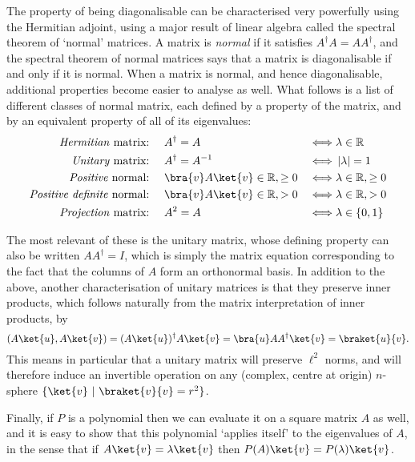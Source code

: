 The property of being diagonalisable can be characterised very powerfully using the Hermitian adjoint, using a major result of linear algebra called the spectral theorem of `normal' matrices. A matrix is \emph{normal} if it satisfies $A^\dagger A = AA^\dagger$, and the spectral theorem of normal matrices says that a matrix is diagonalisable if and only if it is normal. When a matrix is normal, and hence diagonalisable, additional properties become easier to analyse as well. What follows is a list of different classes of normal matrix, each defined by a property of the matrix, and by an equivalent property of all of its eigenvalues:
\begin{align*}
	\text{\emph{Hermitian} matrix:\ }&&& A^\dagger = A & \iff& \lambda \in \mathbb{R} \\
	\text{\emph{Unitary} matrix:\ }&&& A^\dagger = A^{-1} & \iff& \ord{\lambda}=1 \\
	\text{\emph{Positive} normal:\ }&&& \bra{v}A\ket{v} \in \mathbb{R}, \geq 0 & \iff& \lambda \in \mathbb{R}, \geq 0 \\
	\text{\emph{Positive definite} normal:\ }&&& \bra{v}A\ket{v} \in \mathbb{R}, > 0 & \iff& \lambda \in \mathbb{R}, > 0 \\
	\text{\emph{Projection} matrix:\ }&&& A^2 = A & \iff& \lambda \in \{0, 1\} \\
\end{align*}

The most relevant of these is the unitary matrix, whose defining property can also be written $AA^\dagger = I$, which is simply the matrix equation corresponding to the fact that the columns of $A$ form an orthonormal basis. In addition to the above, another characterisation of unitary matrices is that they preserve inner products, which follows naturally from the matrix interpretation of inner products, by
\[(A\ket{u}, A\ket{v}) = (A\ket{u})^\dagger A\ket{v} = \bra{u}AA^\dagger \ket{v} = \braket{u}{v}.\]
This means in particular that a unitary matrix will preserve $\ell^2$ norms, and will therefore induce an invertible operation on any (complex, centre at origin) $n$-sphere $\{\ket{v}\ |\ \braket{v}{v} = r^2\}$.

Finally, if $P$ is a polynomial then we can evaluate it on a square matrix $A$ as well, and it is easy to show that this polynomial `applies itself' to the eigenvalues of $A$, in the sense that if $A\ket{v} = \lambda\ket{v}$ then $P(A)\ket{v} = P(\lambda)\ket{v}$.

